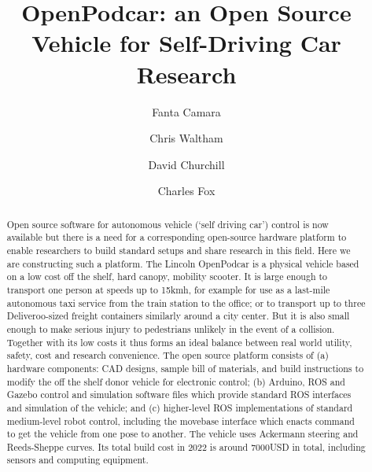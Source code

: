 \documentclass[a4paper]{article}
\title{OpenPodcar: an Open Source Vehicle for Self-Driving Car Research}
\author[1,2]{Fanta Camara}
\author[2]{Chris Waltham}
\author[2]{David Churchill}
\author[1,2]{Charles Fox}
\affil[1]{Institute for Transport Studies, University of Leeds, UK}
\affil[2]{School of Computer Science, University of Lincoln, UK}
\begin{document}
\maketitle


\begin{abstract}
Open source software for autonomous vehicle (`self driving car’) control is now available but there is a need for a corresponding open-source hardware platform to enable researchers to build standard setups and share research in this field.   Here we are constructing such a platform. The Lincoln OpenPodcar is a physical vehicle based on a low cost off the shelf, hard canopy, mobility scooter.  It is large enough to transport one person at speeds up to 15kmh, for example for use as a last-mile autonomous taxi service from the train station to the office; or to transport up to three Deliveroo-sized freight containers similarly around a city center. But it is also small enough to make serious injury to pedestrians unlikely in the event of a collision.  Together with its low costs it thus forms an ideal balance between real world utility, safety, cost and research convenience.  The open source platform consists of (a) hardware components: CAD designs, sample bill of materials, and build instructions to modify the off the shelf donor vehicle for electronic control; (b) Arduino, ROS and Gazebo control and simulation software files which provide standard ROS interfaces and simulation of the vehicle; and (c) higher-level ROS implementations of standard medium-level robot control, including the movebase interface which enacts command to get the vehicle from one pose to another. The vehicle uses Ackermann steering and Reeds-Sheppe curves. Its total build cost in 2022 is around 7000USD in total, including sensors and computing equipment.
\end{abstract}
\end{document}
